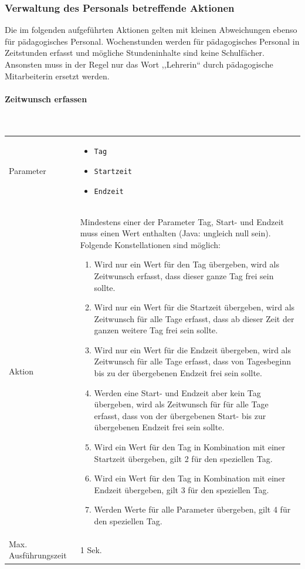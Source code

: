 \documentclass[fontsize=12pt,paper=a4,twoside]{scrartcl}
\begin{document}
\subsubsection{Verwaltung des Personals betreffende Aktionen}

Die im folgenden aufgeführten Aktionen gelten mit kleinen Abweichungen ebenso für pädagogisches Personal. Wochenstunden werden für pädagogisches Personal in Zeitstunden erfasst und mögliche Stundeninhalte sind keine Schulfächer. Ansonsten muss in der Regel nur das Wort ,,Lehrerin`` durch pädagogische Mitarbeiterin ersetzt werden.

\paragraph{Zeitwunsch erfassen}\mbox{}\\


\begin{tabularx}{\textwidth}{p{4cm}X}
Parameter & \begin{itemize}[itemsep=0pt, leftmargin = 0.5cm]
			\item \texttt{Tag}
			\item \texttt{Startzeit}
			\item \texttt{Endzeit}
			\end{itemize}\\
Aktion &  Mindestens einer der Parameter Tag, Start- und Endzeit muss einen Wert enthalten (Java: ungleich null sein). Folgende Konstellationen sind möglich:
\begin{enumerate}
 \item Wird nur ein Wert für den Tag übergeben, wird als Zeitwunsch erfasst, dass dieser ganze Tag frei sein sollte. 
 \item Wird nur ein Wert für die Startzeit übergeben, wird als Zeitwunsch für alle Tage erfasst, dass ab dieser Zeit der ganzen weitere Tag frei sein sollte.
 \item Wird nur ein Wert für die Endzeit übergeben, wird als Zeitwunsch für alle Tage erfasst, dass von Tagesbeginn bis zu der übergebenen Endzeit frei sein sollte.
 \item Werden eine Start- und Endzeit aber kein Tag übergeben, wird als Zeitwunsch für für alle Tage erfasst, dass von der übergebenen Start- bis zur übergebenen Endzeit frei sein sollte.
 \item Wird ein Wert für den Tag in Kombination mit einer Startzeit übergeben, gilt 2 für den speziellen Tag.
 \item Wird ein Wert für den Tag in Kombination mit einer Endzeit übergeben, gilt 3 für den speziellen Tag.
 \item Werden Werte für alle Parameter übergeben, gilt 4 für den speziellen Tag.
 \end{enumerate}  \\
Max. Ausführungszeit & 1 Sek. 
\end{tabularx}\\
\end{document}
